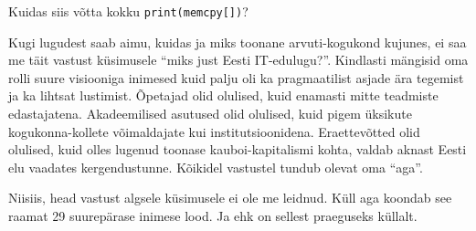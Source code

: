 Kuidas siis võtta kokku \verb|print(memcpy[])|? 

Kugi lugudest saab aimu, kuidas ja miks toonane arvuti-kogukond kujunes, ei saa me täit vastust küsimusele \enquote{miks just Eesti IT-edulugu?}. Kindlasti mängisid oma rolli suure visiooniga inimesed kuid palju oli ka pragmaatilist asjade ära tegemist ja ka lihtsat lustimist. Õpetajad olid olulised, kuid enamasti mitte teadmiste edastajatena. Akadeemilised asutused olid olulised, kuid pigem üksikute kogukonna-kollete võimaldajate kui institutsioonidena. Eraettevõtted olid olulised, kuid olles lugenud toonase kauboi-kapitalismi kohta, valdab aknast Eesti elu vaadates kergendustunne. Kõikidel vastustel tundub olevat oma \enquote{aga}.

Niisiis, head vastust algsele küsimusele ei ole me leidnud. Küll aga koondab see raamat 29 suurepärase inimese lood. Ja ehk on sellest praeguseks küllalt.
